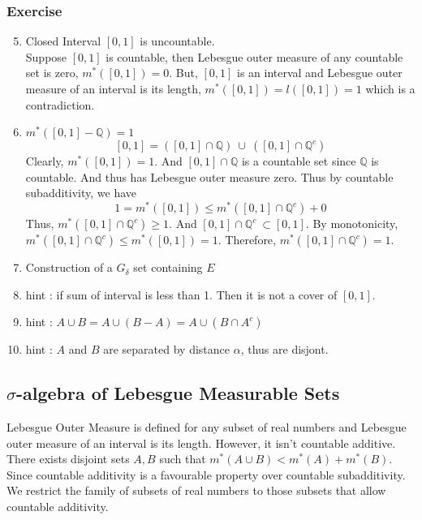\subsubsection{Exercise}
\begin{enumerate}
	\setcounter{enumi}{4}
\item Closed Interval $[0,1]$ is uncountable.\\
	Suppose $[0,1]$ is countable, then Lebesgue outer measure of any countable set is zero, $m^\ast([0,1]) = 0$.
		But, $[0,1]$ is an interval and Lebesgue outer measure of an interval is its length, $m^\ast([0,1]) = l([0,1]) = 1$ which is a contradiction.
\item $m^\ast([0,1] - \mathbb{Q}) = 1$
	$$[0,1] = \left( [0,1] \cap \mathbb{Q} \right)\ \cup\ \left( [0,1]\cap \mathbb{Q}^c \right)$$
	Clearly, $m^\ast([0,1]) = 1$.
		And $[0,1] \cap \mathbb{Q}$ is a countable set since $\mathbb{Q}$ is countable.
		And thus has Lebesgue outer measure zero.
		Thus by countable subadditivity, we have
	$$1 = m^\ast([0,1]) \le m^\ast([0,1] \cap \mathbb{Q}^c) + 0$$
		Thus, $m^\ast([0,1] \cap \mathbb{Q}^c) \ge 1$.
		And $[0,1] \cap \mathbb{Q}^c\ \subset [0,1]$.
		By monotonicity, $m^\ast([0,1] \cap \mathbb{Q}^c) \le m^\ast([0,1]) = 1$.
		Therefore, $m^\ast([0,1] \cap \mathbb{Q}^c) = 1$.
	\item Construction of a $G_\delta$ set containing $E$ %
	\item hint : if sum of interval is less than 1.
		Then it is not a cover of $[0,1]$.
	\item hint : $A \cup B = A \cup (B-A) = A \cup (B \cap A^c)$
	\item hint : $A$ and $B$ are separated by distance $\alpha$, thus are disjont.
\end{enumerate}

\subsection{$\sigma$-algebra of Lebesgue Measurable Sets}
	Lebesgue Outer Measure is defined for any subset of real numbers and Lebesgue outer measure of an interval is its length.
	However, it isn't countable additive.\\

	There exists disjoint sets $A,B$ such that $m^\ast(A\cup B) < m^\ast(A)+m^\ast(B)$.\\
	
	Since countable additivity is a favourable property over countable subadditivity.
	We restrict the family of subsets of real numbers to those subsets that allow countable additivity.
	
